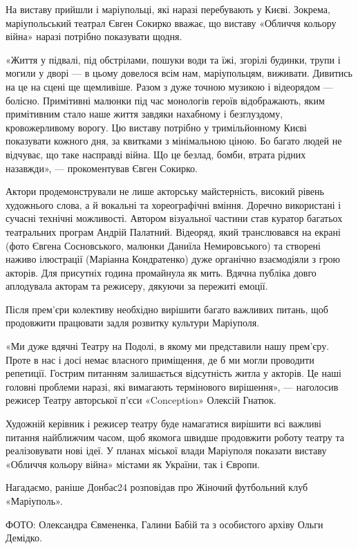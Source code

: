 На виставу прийшли і маріупольці, які наразі перебувають у Києві. Зокрема,
маріупольський театрал Євген Сокирко вважає, що виставу «Обличчя кольору війна»
наразі потрібно показувати щодня.

«Життя у підвалі, під обстрілами, пошуки води та їжі, згорілі будинки, трупи і
могили у дворі — в цьому довелося всім нам, маріупольцям, виживати. Дивитись на
це на сцені ще щемливіше. Разом з дуже точною музикою і відеорядом — болісно.
Примітивні малюнки під час монологів героїв відображають, яким примітивним
стало наше життя завдяки нахабному і безглуздому, кровожерливому ворогу. Цю
виставу потрібно у тримільйонному Києві показувати кожного дня, за квитками з
мінімальною ціною. Бо багато людей не відчуває, що таке насправді війна. Що це
безлад, бомби, втрата рідних назавжди», — прокоментував Євген Сокирко.

Актори продемонстрували не лише акторську майстерність, високий рівень
художнього слова, а й вокальні та хореографічні вміння. Доречно використані і
сучасні технічні можливості. Автором візуальної частини став куратор багатьох
театральних програм Андрій Палатний. Відеоряд, який транслювався на екрані
(фото Євгена Сосновського, малюнки Даниїла Немировського) та створені наживо
ілюстрації (Маріанна Кондратенко) дуже органічно взаємодіяли з грою акторів.
Для присутніх година промайнула як мить. Вдячна публіка довго аплодувала
акторам та режисеру, дякуючи за пережиті емоції. 

Після прем'єри колективу необхідно вирішити багато важливих питань, щоб
продовжити працювати задля розвитку культури Маріуполя.

«Ми дуже вдячні Театру на Подолі, в якому ми представили нашу прем'єру. Проте в
нас і досі немає власного приміщення, де б ми могли проводити репетиції.
Гострим питанням залишається відсутність житла у акторів. Це наші головні
проблеми наразі, які вимагають термінового вирішення», — наголосив режисер
Театру авторської п'єси «Conception» Олексій Гнатюк.

Художній керівник і режисер театру буде намагатися вирішити всі важливі питання
найближчим часом, щоб якомога швидше продовжити роботу театру та реалізовувати
нові ідеї. У планах міської влади Маріуполя показати виставу «Обличчя кольору
війна» містами як України, так і Європи.

Нагадаємо, раніше Донбас24 розповідав про Жіночий футбольний клуб «Маріуполь».

ФОТО: Олександра Євмененка, Галини Бабій та з особистого архіву Ольги Демідко.
